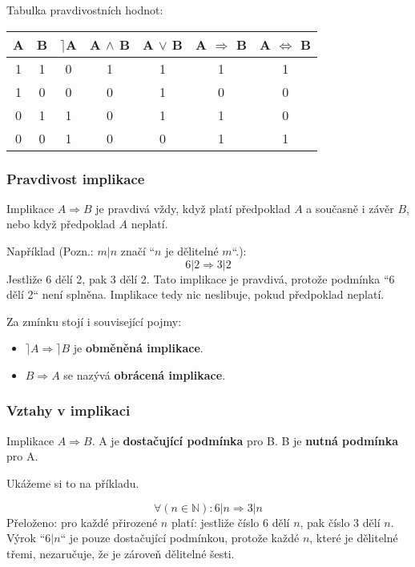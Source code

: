 \documentclass[12pt, a4paper]{scrartcl}
\begin{document}
    Tabulka pravdivostních hodnot:
    \begin{tabular}{|c|c|c|c|c|c|c|}
        \hline
        A & B & $\rceil$A & A $\wedge$ B & A $\vee$ B & A $\Rightarrow$ B & A $\Leftrightarrow$ B \\
        \hline
        1 & 1 & 0 & 1 & 1 & 1 & 1 \\
        \hline
        1 & 0 & 0 & 0 & 1 & 0 & 0 \\
        \hline
        0 & 1 & 1 & 0 & 1 & 1 & 0 \\
        \hline
        0 & 0 & 1 & 0 & 0 & 1 & 1 \\
        \hline
    \end{tabular}

    \subsubsection{Pravdivost implikace}
    Implikace $A \Rightarrow B$ je pravdivá vždy, když platí předpoklad $A$ a současně i závěr $B$, 
    nebo když předpoklad $A$ neplatí.  

    Například (Pozn.: $m|n$ značí ``$n$ je dělitelné $m$``.):
    \[ 6|2 \Rightarrow 3|2\]
    Jestliže 6 dělí 2, pak 3 dělí 2. Tato implikace je pravdivá, 
    protože podmínka ``6 dělí 2`` není splněna. Implikace tedy nic neslibuje, pokud předpoklad neplatí.

    Za zmínku stojí i související pojmy:
    \begin{itemize}
        \item $\rceil A \Rightarrow \rceil B$ je \textbf{obměněná implikace}.
        \item $B \Rightarrow A$ se nazývá \textbf{obrácená implikace}.
    \end{itemize}

    \subsubsection{Vztahy v implikaci}
    Implikace $A \Rightarrow B$. A je \textbf{dostačující podmínka} pro B. 
    B je \textbf{nutná podmínka} pro A.  

    Ukážeme si to na příkladu.

    \[\forall (n \in \mathds{N}): 6|n \Rightarrow 3|n\]
    Přeloženo: pro každé přirozené $n$ platí: jestliže číslo 6 dělí $n$, pak číslo 3 dělí $n$.  
    Výrok ``$6|n$`` je pouze dostačující podmínkou, protože každé $n$, které je dělitelné třemi, 
    nezaručuje, že je zároveň dělitelné šesti.
\end{document}
